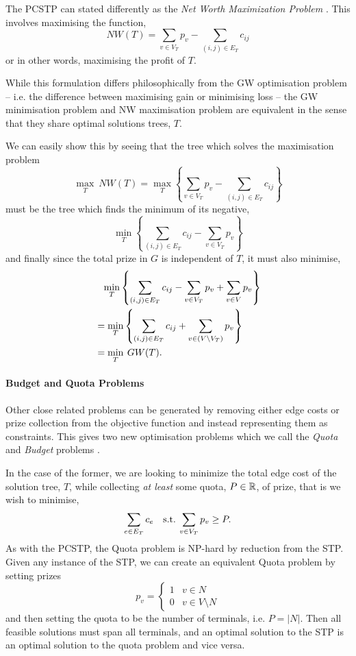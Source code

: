  The PCSTP can stated differently as the {\textit{Net Worth Maximization Problem}} \citep{Johnson:2000:PCS:338219.338637}.
  This involves maximising the function,
$$NW(T) = \sum_{v \in V_T} p_v - \sum_{(i,j) \in E_T} c_{ij}$$
or in other words, maximising the profit of $T$.

While this formulation differs philosophically from the GW optimisation problem
-- i.e. the difference between maximising gain or minimising loss --
the GW minimisation problem and NW maximisation problem are equivalent in the sense that they share optimal solutions trees, $T$.


We can easily show this by seeing that the tree which solves the maximisation problem
$$\max_T \: NW(T) = \max_T \left\{ \sum_{v \in V_T} p_v - \sum_{(i,j) \in E_T} c_{ij} \right\}$$
must be the tree which finds the minimum of its negative,
$$\min_T \left\{ \sum_{(i,j) \in E_T} c_{ij} - \sum_{v \in V_T} p_v\right\}$$
and finally since the total prize in $G$ is independent of $T$, it must also minimise,
\begin{align*}
  &\phantom{=}\min_T \left\{ \sum_{(i,j) \in E_T} c_{ij} - \sum_{v \in V_T} p_v + \sum_{v \in V} p_v \right\} \\
  &=\min_T \left\{ \sum_{(i,j) \in E_T} c_{ij} + \sum_{v \in (V \setminus V_T)} p_v \right\} \\
  &= \min_T \: GW(T)\mathnormal{.}
\end{align*}

\paragraph{Budget and Quota Problems}

Other close related problems can be generated by removing either edge costs or prize collection from the
objective function and instead representing them as constraints. This gives two new optimisation problems
which we call the \textit{Quota} and \textit{Budget} problems \citep{Johnson:2000:PCS:338219.338637}.

In the case of the former, we are looking to minimize the total edge cost of the solution tree, $T$, while
collecting \textit{at least} some quota, $P \in \mathbb{R}$, of prize, that is we wish to minimise,
$$\sum_{e \in E_T} c_e \quad \text{s.t.} \: \sum_{v \in V_T} p_v \geq P\mathnormal{.}$$
As with the PCSTP, the Quota problem is NP-hard by reduction from the STP. Given any instance of the STP,
we can create an equivalent Quota problem by setting prizes
$$p_v =
\begin{cases}
  1 & v \in N \\
  0 & v \in V \setminus N
\end{cases}
$$
and then setting the quota to be the number of terminals, i.e. $P = |N|$. Then all feasible solutions
must span all terminals, and an optimal solution to the STP is an optimal solution to the quota problem
 and vice versa.


